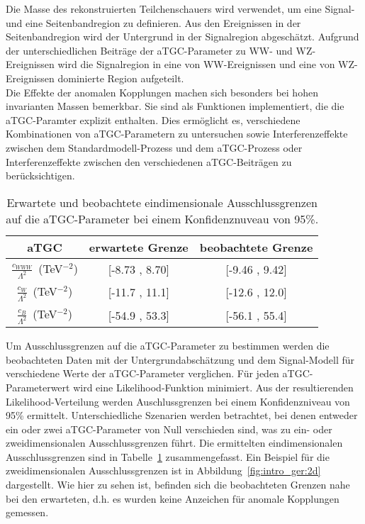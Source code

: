 Die Masse des rekonstruierten Teilchenschauers wird verwendet, um eine Signal- und eine Seitenbandregion zu  definieren. Aus den Ereignissen in der Seitenbandregion wird der Untergrund in der Signalregion abgeschätzt. Aufgrund der unterschiedlichen Beiträge der aTGC-Parameter zu WW- und WZ-Ereignissen wird die Signalregion in eine von WW-Ereignissen und eine von WZ-Ereignissen dominierte Region aufgeteilt. \\

Die Effekte der anomalen Kopplungen machen sich besonders bei hohen invarianten Massen bemerkbar. Sie sind als Funktionen implementiert, die die aTGC-Paramter explizit enthalten. Dies ermöglicht es, verschiedene Kombinationen von aTGC-Parametern zu untersuchen sowie Interferenzeffekte zwischen dem Standardmodell-Prozess und dem aTGC-Prozess oder Interferenzeffekte zwischen den verschiedenen aTGC-Beiträgen zu berücksichtigen.\\

\begin{table}
	\centering
	\caption[Erwartete und beobachtete Ausschlussgrenzen bei einem Konfidenznuveau von 95\%]{Erwartete und beobachtete eindimensionale Ausschlussgrenzen auf die aTGC-Parameter bei einem Konfidenznuveau von 95\%.}
	\label{tab:intro_ger:1d}
	\begin{tabular}{ccc}
	\hline
	aTGC              &     erwartete Grenze & beobachtete Grenze\\
	\hline
	$\frac{c_{WWW}}{\Lambda ^2}$~(TeV$^{-2}$) &  [-8.73 , 8.70] &  [-9.46 , 9.42] \\
	$\frac{c_{W}}{\Lambda ^2}$~(TeV$^{-2}$)   &  [-11.7 , 11.1] &  [-12.6 , 12.0] \\
	$\frac{c_{B}}{\Lambda ^2}$~(TeV$^{-2}$)   & [-54.9 , 53.3] &  [-56.1 , 55.4] \\
	\hline
	\end{tabular}
\end{table}

Um Ausschlussgrenzen auf die aTGC-Parameter zu bestimmen werden die beobachteten Daten mit der Untergrundabschätzung und dem Signal-Modell für verschiedene Werte der aTGC-Parameter verglichen. Für jeden aTGC-Parameterwert wird eine Likelihood-Funktion minimiert. Aus der resultierenden Likelihood-Verteilung werden Auschlussgrenzen bei einem Konfidenzniveau von 95\% ermittelt. Unterschiedliche Szenarien werden betrachtet, bei denen entweder ein oder zwei aTGC-Parameter von Null verschieden sind, was zu ein- oder zweidimensionalen Ausschlussgrenzen führt. Die ermittelten eindimensionalen Ausschlussgrenzen sind in Tabelle~\ref{tab:intro_ger:1d} zusammengefasst. Ein Beispiel für die zweidimensionalen Ausschlussgrenzen ist in Abbildung~\ref{fig:intro_ger:2d} dargestellt. Wie hier zu sehen ist, befinden sich die beobachteten Grenzen nahe bei den erwarteten, d.h. es wurden keine Anzeichen für anomale Kopplungen gemessen.\\

